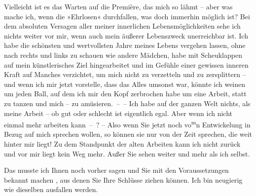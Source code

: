 \pstart
           Vielleicht ist es das Warten auf die Première,
               das mich so lähmt – aber was mache ich, wenn die »Ehrlosen« {\pb}durchfallen, was doch immerhin
               möglich ist? Bei dem absoluten Versagen aller meiner innerlichen Lebensmöglichkeiten
               sehe ich nichts weiter vor mir, wenn auch mein äußerer Lebenszweck unerreichbar ist.
               Ich habe die schönsten und wertvollsten Jahre meines Lebens vergehen lassen, ohne
               nach rechts und links zu schauen wie andere Mädchen, habe mit Scheuklappen auf mein
               künstlerisches Ziel hingearbeitet und im Gefühle einer gewissen inneren Kraft auf
               Manches verzichtet, um mich nicht zu verzetteln und zu zersplittern – und wenn ich
               mir jetzt vorstelle, dass das Alles umsonst war, könnte ich weinen um jeden Ball, auf
               dem ich mir den Kopf zerbrochen habe um eine Arbeit, statt zu tanzen und mich – zu
               amüsieren. – – Ich habe auf {\pb}der ganzen Welt nichts,
               als meine Arbeit – ob gut oder schlecht ist eigentlich egal. Aber wenn ich nicht
               einmal mehr arbeiten kann – ? – Also wenn Sie jetzt noch vo\substVorne{}\textsuperscript{m}\substDazwischen{}n\substHinten{} Entwickelung in Bezug auf mich sprechen wollen, so können sie nur von der
               Zeit sprechen, die weit hinter mir liegt! Zu dem Standpunkt der alten Arbeiten kann
               ich nicht zurück und vor mir liegt kein Weg mehr. Außer Sie sehen weiter und mehr als
               ich selbst.\pend
           
\pstart
           Das musste ich Ihnen noch vorher sagen und 
               Sie mit den Voraussetzungen bekannt machen ,
               aus denen Sie Ihre Schlüsse ziehen {\pb}können. Ich bin
               neugierig wie dieselben ausfallen werden.\pend
           
